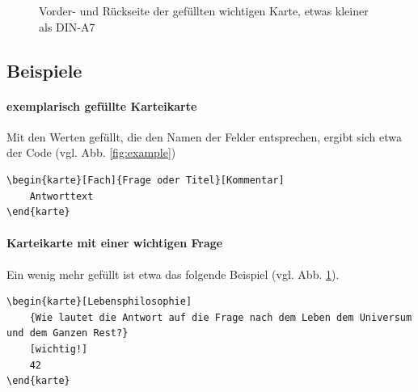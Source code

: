 \documentclass[a4paper,DIV=calc]{scrartcl}
\begin{document}
\begin{figure}
	\quad	{}
	\caption{Vorder- und Rückseite der gefüllten wichtigen Karte, etwas kleiner als DIN-A7}\label{fig:completeexample}
\end{figure}

\subsection{Beispiele}
\paragraph{exemplarisch gefüllte Karteikarte}
Mit den Werten gefüllt, die den Namen der Felder entsprechen, ergibt sich etwa der Code (vgl. Abb. \ref{fig:example})
	\begin{lstlisting}
\begin{karte}[Fach]{Frage oder Titel}[Kommentar]
	Antworttext
\end{karte}
	\end{lstlisting}

\paragraph{Karteikarte mit einer wichtigen Frage}
	Ein wenig mehr gefüllt ist etwa das folgende Beispiel (vgl. Abb. \ref{fig:completeexample}).
	\begin{lstlisting}
\begin{karte}[Lebensphilosophie]
	{Wie lautet die Antwort auf die Frage nach dem Leben dem Universum und dem Ganzen Rest?}
	[wichtig!]
	42
\end{karte}		
	\end{lstlisting}	
\end{document}
